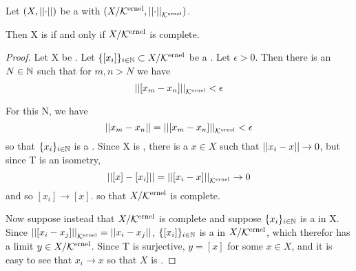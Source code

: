 \begin{prop}
\label{prop:quotientspreservecompleteness}
Let $(X,\left|\left| \cdot \right|\right|)$ be a \SeminormedSpace with \QuotientNormedSpace $(X/\bf\mathcal{K}\rm^{ernel}, \left|\left| \cdot \right|\right|_{\bf\mathcal{K}\rm^{ernel}})$. 

Then X is \PseudometricComplete if and only if $X/\bf\mathcal{K}\rm^{ernel}$ is complete. 

\begin{proof}
Let X be \PseudometricComplete. 
Let $\{[x_i]\}_{i \in \mathbb{N}} \subset X/\bf\mathcal{K}\rm^{ernel}$ be a \PseudometricCauchySequence. 
Let $\epsilon > 0$. 
Then there is an $N \in \mathbb{N}$ such that for $m,n > N$ we have 
\begin{equation}
\left|\left| [x_m-x_n] \right|\right|_{\bf\mathcal{K}\rm^{ernel}} < \epsilon
\end{equation}

For this N, we have 
\begin{equation}
\left|\left| x_m-x_n \right|\right| = \left|\left| [x_m-x_n] \right|\right|_{\bf\mathcal{K}\rm^{ernel}} < \epsilon
\end{equation}
so that $\{x_i\}_{i \in \mathbb{N}}$ is a \PseudometricCauchySequence. 
Since X is \PseudometricComplete, 
there is a 
$x \in X$ such that $\left|\left| x_i-x \right|\right| \to 0$, 
but since T is an isometry, 
\begin{equation}
\left|\left| [x]-[x_i] \right|\right|=\left|\left| [x_i-x] \right|\right|_{\bf\mathcal{K}\rm^{ernel}} \to 0
\end{equation}
and so 
$[x_i] \to [x]$.
so that $X/\bf\mathcal{K}\rm^{ernel}$ is complete. 

Now suppose instead that $X/\bf\mathcal{K}\rm^{ernel}$ is complete 
and suppose $\{x_i\}_{i \in \mathbb{N}}$ is a \PseudometricCauchySequence in X. 
Since $\left|\left| [x_i-x_j] \right|\right|_{\bf\mathcal{K}\rm^{ernel}} = \left|\left| x_i-x_j \right|\right|$, 
$\{[x_i]\}_{i \in \mathbb{N}}$ is a \PseudometricCauchySequence in $X/\bf\mathcal{K}\rm^{ernel}$, which therefor has a 
limit $y \in X/\bf\mathcal{K}\rm^{ernel}$. Since T is surjective, $y=[x]$ for some $x \in X$, and it is easy to see that
$x_i \to x$ so that $X$ is \PseudometricComplete. 

\end{proof}
\end{prop}
